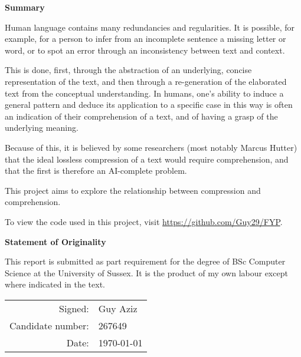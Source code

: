 \newpage
\thispagestyle{empty} %


\begin{center}
    \textbf{\Large Summary}
    \vspace{0.5cm}
\end{center}

\noindent Human language contains many redundancies and regularities. It is possible, for example, for a person to infer from an incomplete sentence a missing letter or word, or to spot an error through an inconsistency between text and context.

\noindent This is done, first, through the abstraction of an underlying, concise representation of the text, and then through a re-generation of the elaborated text from the conceptual understanding. In humans, one's ability to induce a general pattern and deduce its application to a specific case in this way is often an indication of their comprehension of a text, and of having a grasp of the underlying meaning.

\noindent Because of this, it is believed by some researchers (most notably Marcus Hutter) that the ideal lossless compression of a text would require comprehension, and that the first is therefore an AI-complete problem.

\noindent This project aims to explore the relationship between compression and comprehension.

\noindent To view the code used in this project, visit \url{https://github.com/Guy29/FYP}.


\begin{center}
    \textbf{\Large Statement of Originality}
    \vspace{1cm}
\end{center}

\noindent This report is submitted as part requirement for the degree of BSc Computer Science at the University of Sussex. It is the product of my own labour except where indicated in the text.

\begin{flushright}

\begin{tabular}{rl}
    Signed: & Guy Aziz \\
    Candidate number: & 267649 \\
    Date: & \today
\end{tabular}

\end{flushright}




\clearpage
